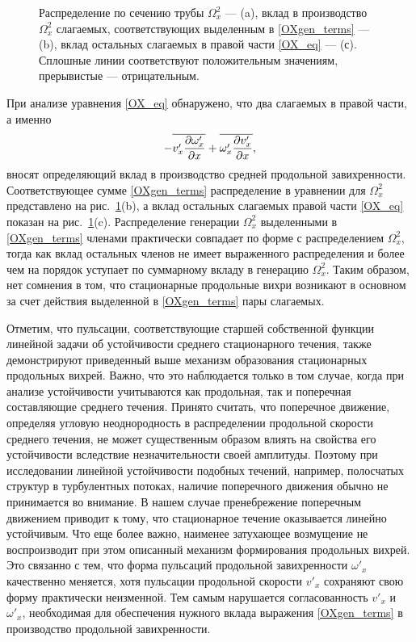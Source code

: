 \begin{figure}[h]
\caption{Распределение по сечению трубы $\Omega_x^2$ --- (a), вклад в производство $\Omega_x^2$ слагаемых, соответствующих выделенным в \eqref{OXgen_terms} --- (b), вклад остальных слагаемых в правой части \eqref{OX_eq} --- (с). Сплошные линии соответствуют положительным значениям, прерывистые --- отрицательным.}
\label{OXgen_pic}
\end{figure}

При анализе уравнения \eqref{OX_eq} обнаружено, что два слагаемых в правой части, а именно
\begin{equation}\label{OXgen_terms}
 - \overline{v'_x \frac{\partial \omega'_x}{\partial x}} + \overline{ \omega'_x \frac{\partial v'_x}{\partial x} },
\end{equation}
вносят определяющий вклад в производство средней продольной завихренности. Соответствующее сумме \eqref{OXgen_terms}  распределение в уравнении для $\Omega_x^2$ представлено на рис.~\ref{OXgen_pic}(b), а вклад остальных слагаемых правой части \eqref{OX_eq} показан на рис.~\ref{OXgen_pic}(c). Распределение генерации $\Omega_x^2$ выделенными в \eqref{OXgen_terms} членами практически совпадает по форме с распределением $\Omega_x^2$, тогда как вклад остальных членов не имеет выраженного распределения и более чем на порядок уступает по суммарному вкладу в генерацию $\Omega_x^2$. Таким образом, нет сомнения в том, что стационарные продольные вихри возникают в основном за счет действия выделенной в \eqref{OXgen_terms} пары слагаемых.

Отметим, что пульсации, соответствующие старшей собственной функции линейной задачи об устойчивости среднего стационарного течения, также демонстрируют приведенный выше механизм образования стационарных продольных вихрей. Важно, что это наблюдается только в том случае, когда при анализе устойчивости учитываются как продольная, так и поперечная составляющие среднего течения. Принято считать, что поперечное движение, определяя угловую неоднородность в распределении продольной скорости среднего течения, не может существенным образом влиять на свойства его устойчивости вследствие незначительности своей амплитуды. Поэтому при исследовании линейной устойчивости подобных течений, например, полосчатых структур в турбулентных потоках, наличие поперечного движения обычно не принимается во внимание. В нашем случае пренебрежение поперечным движением приводит к тому, что стационарное течение оказывается линейно устойчивым. Что еще более важно, наименее затухающее возмущение не воспроизводит при этом описанный механизм формирования продольных вихрей. Это связанно с тем, что форма пульсаций продольной завихренности $\omega'_x$ качественно меняется, хотя пульсации продольной скорости $v'_x$ сохраняют свою форму практически неизменной. Тем самым нарушается согласованность  $v'_x$ и $\omega'_x$, необходимая для обеспечения нужного вклада выражения \eqref{OXgen_terms} в производство продольной завихренности.

